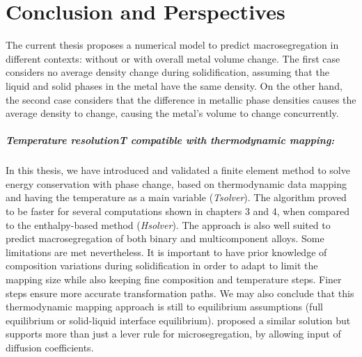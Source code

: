 \chapter*{Conclusion and Perspectives}


The current thesis proposes a numerical model to predict macrosegregation in different contexts: without or
with overall metal volume change. The first case considers no average density change during solidification, 
assuming that the liquid and solid phases in the metal have the same density. 
On the other hand, the second case considers that the difference in metallic phase densities causes the average density to change, causing the metal's volume to
change concurrently. 

\paragraph{Temperature resolutionT compatible with thermodynamic mapping:}
In this thesis, we have introduced and validated a finite element method to solve energy conservation with phase change, based 
on thermodynamic data mapping and having the temperature as a main variable (\emph{Tsolver}). The algorithm proved to be faster for several computations
shown in chapters 3 and 4, when compared to the enthalpy-based method (\emph{Hsolver}). The approach is also well suited to predict macrosegregation
of both binary and multicomponent alloys. Some limitations are met nevertheless. It is important to have prior knowledge of composition variations
during solidification in order to adapt to limit the mapping size while also keeping fine composition and temperature steps.
Finer steps ensure more accurate transformation paths. We may also conclude that this thermodynamic mapping approach is still
to equilibrium assumptions (full equilibrium or solid-liquid interface equilibrium). \citet{tourret_multiple_2011} proposed
a similar solution but supports more than just a lever rule for microsegregation, by allowing input of diffusion coefficients.

